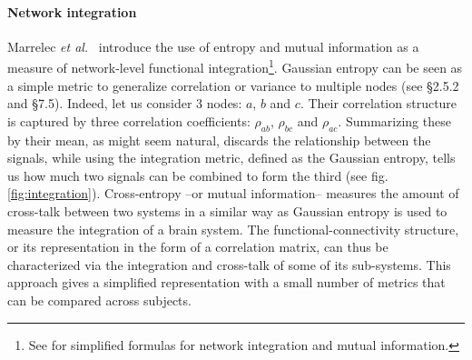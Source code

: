 \documentclass[5p]{elsarticle}
\begin{document}
\paragraph{Network integration}
%
Marrelec \emph{et al.}\
\cite{marrelec2008} introduce the use of entropy and mutual information
as a measure of network-level functional integration\footnote{See \cite{varoquaux2010c}
for simplified formulas for network integration and mutual information.}.
Gaussian entropy can be seen as a simple metric to generalize correlation
or variance to multiple nodes (see \cite{anderson1958} \S2.5.2 and
\S7.5). Indeed, let us consider 3 nodes: $a$, $b$ and $c$. Their
correlation structure is captured by three correlation coefficients:
$\rho_{ab}$, $\rho_{bc}$ and $\rho_{ac}$. Summarizing these by their
mean, as might seem natural, discards the relationship between the
signals, while using the integration metric, defined as the Gaussian entropy, tells us how much two signals can be
combined to form the third (see fig.\,\ref{fig:integration}). 
Cross-entropy --or mutual information--
\cite{marrelec2008} measures the amount of cross-talk between two
systems in a similar way as Gaussian entropy is used to measure the
integration of a brain
system. The functional-connectivity structure, or its representation in
the form of a correlation matrix, can thus be characterized via the
integration and cross-talk of some of its sub-systems. This approach
gives a simplified representation with a small number of metrics that can
be compared across subjects.
\end{document}
